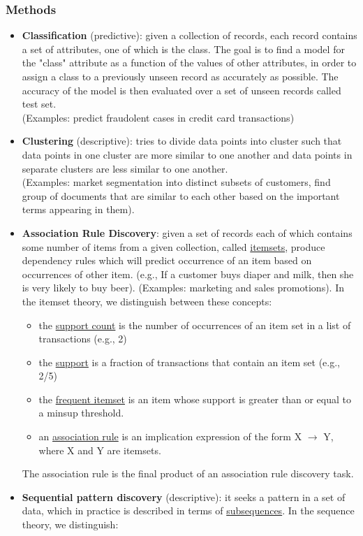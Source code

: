 \documentclass[10pt,a4paper]{article}
\begin{document}
\begin{justify}
\subsubsection{Methods}
\begin{itemize}
	\item \textbf{Classification} (predictive): given a collection of records, each record contains a set of attributes, one of which is the class. The goal is to find a model for the "class" attribute as a function of the values of other attributes, in order to assign a class to a previously unseen record as accurately as possible. The accuracy of the model is then evaluated over a set of unseen records called test set. \\ (Examples: predict fraudolent cases in credit card transactions)
	\item \textbf{Clustering} (descriptive): tries to divide data points into cluster such that data points in one cluster are more similar to one another and data points in separate clusters are less similar to one another. \\ 
	(Examples: market segmentation into distinct subsets of customers, find group of documents that are similar to each other based on the important terms appearing in them).
	\item \textbf{Association Rule Discovery}: given a set of records each of which contains some number of items from a given collection, called \uline{itemsets}, produce dependency rules which will predict occurrence of an item based on occurrences of other item. (e.g., If a customer buys diaper and milk, then she is very likely to buy beer). (Examples: marketing and sales promotions). In the itemset theory, we distinguish between these concepts: 
	\begin{itemize}
		\item the \uline{support count} is the number of occurrences of an item set in a list of transactions (e.g., 2)
		\item the \uline{support} is a fraction of transactions that contain an item set (e.g., 2/5)
		\item the \uline{frequent itemset} is an item whose support is greater than or equal to a minsup threshold.
		\item an \uline{association rule} is an implication expression of the form X $\rightarrow$ Y, where X and Y are itemsets.
	\end{itemize}
	The association rule is the final product of an association rule discovery task.
	\item \textbf{Sequential pattern discovery} (descriptive): it seeks a pattern in a set of data, which in practice is described in terms of \uline{subsequences}. In the sequence theory, we distinguish:

\end{itemize}
\end{justify}
\end{document}
